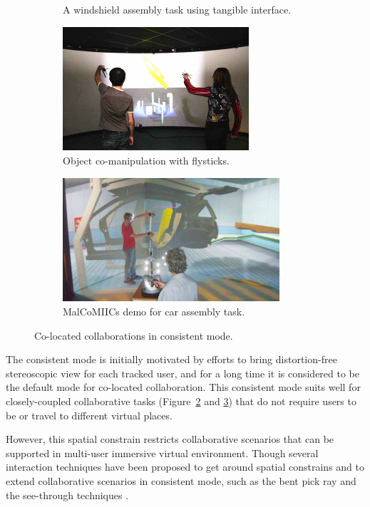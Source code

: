 \begin{figure}[htb]
\begin{subfigure}{.7\textwidth}
    \caption{A windshield assembly task using tangible interface.}
    \label{fig:2_consistent_collab:tangible}
  \end{subfigure}
  \begin{subfigure}{.45\textwidth}
    \centering
    \includegraphics[height=4.6cm]{figures/ch2/comanip}
    \caption{Object co-manipulation with flysticks.}
    \label{fig:2_consistent_collab:comanip}
  \end{subfigure}
  \begin{subfigure}{.55\textwidth}
    \centering
    \includegraphics[height=4.6cm]{figures/ch2/malcomiics}
    \caption{MalCoMIICs demo for car assembly task.}
    \label{fig:2_consistent_collab:malcomiics}
  \end{subfigure}
  \caption{\label{fig:2_consistent_collab}Co-located collaborations in consistent mode.}
\end{figure}

The consistent mode is initially motivated by efforts to bring distortion-free stereoscopic view for each tracked user, and for a long time it is considered to be the default mode for co-located collaboration. This consistent mode suits well for closely-coupled collaborative tasks \citep{Simon2005First, Aguerreche2010Comparison, Martin2011Reconfigurable} (Figure~\ref{fig:2_consistent_collab:comanip} and \ref{fig:2_consistent_collab:malcomiics}) that do not require users to be or travel to different virtual places.

However, this spatial constrain restricts collaborative scenarios that can be supported in multi-user immersive virtual environment. Though several interaction techniques have been proposed to get around spatial constrains and to extend collaborative scenarios in consistent mode, such as the bent pick ray \citep{Riege2006Bent} and the see-through techniques \citep{Argelaguet2010STT}.

